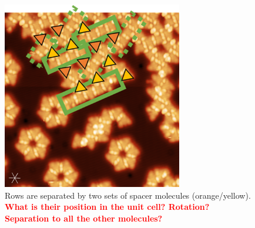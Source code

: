 \begin{figure}[] \centering
	\includegraphics[width=0.7\textwidth]{./images/hbbnc-ag-111-rt-med-coverage-spacer-mol}
	\caption{Rows are separated by two sets of spacer molecules (orange/yellow). 
		\textcolor{red}{\textbf{What is their position in the unit cell? Rotation? Separation to all the other molecules?}}
	}
	\label{}
\end{figure}

